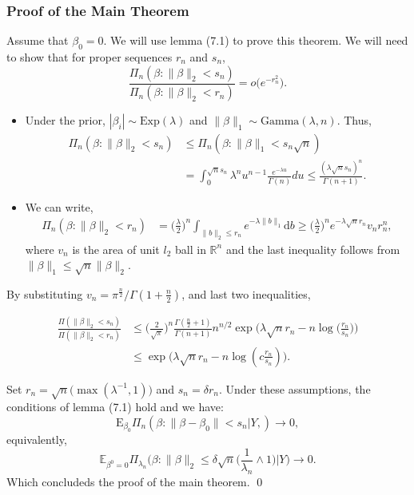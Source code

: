\documentclass[usenames,dvipsnames]{beamer}
\newcommand{\given}{|}
\newcommand{\E}{\mathrm{E}}
\newcommand{\be}{\beta}
\renewcommand{\b}{\beta}
\newcommand{\la}{\lambda}
\newcommand{\q}{\beta}
\newcommand{\RR}{\mathbb{R}}
\begin{document}
\begin{frame}
	\frametitle{Proof of the Main Theorem}
	\begin{small}
	Assume that $\b_0 = 0$. We will use lemma (7.1) to prove this theorem. We will need to show that for  proper sequences $r_n$ and $s_n$, 
			\[
	\frac{\Pi_n (\q:\|\q\|_2< s_n )} {
		\Pi_n (\q:\|\q\|_2< r_n )}=o\bigl(e^{-r_n^2}\bigr).
	\]
	\vspace{-0.5cm}
	\begin{itemize}
		\item 
		Under the prior, $|\beta_i|\sim \mathrm{Exp}(\lambda)$ and $\|\beta\|_1\sim \mathrm{Gamma}(\lambda, n)$. Thus, 	
			\begin{align*}
			\Pi_n(\b: \|\b\|_2 < s_n) &\leq 	\Pi_n(\b: \|\b\|_1 < s_n\sqrt{n})\\
			&= \int_{0}^{\sqrt{n}s_n} \lambda^n u^{n-1} \frac{e^{-\lambda u}}{\Gamma(n)} du\leq \frac{(\lambda \sqrt{n} s_n)^n}{\Gamma(n+1)}.	
			\end{align*}	

		\item  		\vspace{-0.2cm}		 We can write,
			\begin{align*}
			\Pi_n(\b: \|\b\|_2 < r_n) &= \Big(\frac{\lambda}{2}\Big)^n \int_{\|b\|_2\leq r_n} e^{-\lambda \|b\|_1} \mathrm{d}b \geq \Big(\frac{\lambda}{2}\Big)^n e^{-\lambda \sqrt{n}r_n} v_n r_n^n,
			\end{align*}	
			where $v_n$ is the area of unit $l_2$ ball in $\RR^n$ and the last inequality follows from $\|\b\|_1 \leq \sqrt{n}\|\b\|_2$.
	\end{itemize}

	\end{small}
\end{frame}

\begin{frame}
	\begin{small}
	By substituting $v_n = \pi^{\frac{n}{2}}/\Gamma(1+\frac{n}{2})$, and last two inequalities, 
	
	\begin{align*}
		\frac{\Pi(\|\b\|_2<s_n)}{\Pi(\|\b\|_2<r_n)} &\leq \Big(\frac{2}{\sqrt{\pi}}\Big)^n \frac{\Gamma(\frac{n}{2}+1)}{\Gamma(n+1)} n^{n/2} \exp\Big(\lambda \sqrt{n}r_n - n\log\big(\frac{r_n}{s_n}\big)\Big)\\
		&\leq \exp\bigg(\lambda \sqrt{n}r_n - n\log(c\frac{r_n}{s_n})\bigg).
	\end{align*}
	
	Set $r_n = \sqrt{n}\big(\max(\lambda^{-1}, 1)\big)$ and $s_n = \delta r_n$. Under these assumptions, the conditions of lemma (7.1) hold and we have:
	$$\E_{\q_0}\Pi_n (\q:\|\q-\q_0\|<s_n\given Y,
	)\to0,$$
	equivalently,
	\[
	\mathbb{E}_{\be^0=0} \Pi_{\la_n} \biggl(\be: \|\be
	\|_2\le\delta \sqrt{n} \biggl(\frac{1}{\la_n}\wedge1 \biggr) \Big| Y
	\biggr) \rightarrow0.
	\]
	Which concludeds the proof of the main theorem. \qed
	\end{small}
\end{frame}
\end{document}
